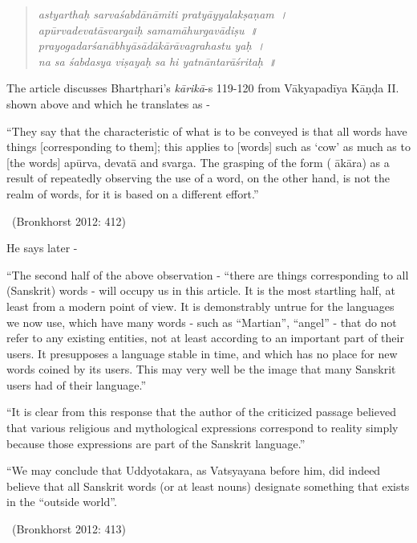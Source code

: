 \begin{verse}
\textit{astyarthaḥ sarvaśabdānāmiti pratyāyyalakṣaṇam~।}\\\textit{apūrvadevatāsvargaiḥ samamāhurgavādiṣu~॥}\\\textit{prayogadarśanābhyāsādākārāvagrahastu yaḥ~।}\\\textit{na sa śabdasya viṣayaḥ sa hi yatnāntarāśritaḥ~॥} 
\end{verse}

The article discusses Bhartṛhari’s \textit{kārikā}-s 119-120 from Vākyapadīya Kāṇḍa II. shown above and which he translates as -

\begin{myquote}
“They say that the characteristic of what is to be conveyed is that all words have things [corresponding to them]; this applies to [words] such as ‘cow’ as much as to [the words] apūrva, devatā and svarga. The grasping of the form ( ākāra) as a result of repeatedly observing the use of a word, on the other hand, is not the realm of words, for it is based on a different effort.” 

~\hfill (Bronkhorst 2012: 412)
\end{myquote}

He says later -

\begin{myquote}
“The second half of the above observation - “there are things corresponding to all (Sanskrit) words - will occupy us in this article. It is the most startling half, at least from a modern point of view. It is demonstrably untrue for the languages we now use, which have many words - such as “Martian”, “angel” - that do not refer to any existing entities, not at least according to an important part of their users. It presupposes a language stable in time, and which has no place for new words coined by its users. This may very well be the image that many Sanskrit users had of their language.”
\end{myquote}

\begin{myquote}
“It is clear from this response that the author of the criticized passage believed that various religious and mythological expressions correspond to reality simply because those expressions are part of the Sanskrit language.”
\end{myquote}

\begin{myquote}
“We may conclude that Uddyotakara, as Vatsyayana before him, did indeed believe that all Sanskrit words (or at least nouns) designate something that exists in the “outside world”. 

~\hfill (Bronkhorst 2012: 413)
\end{myquote}

